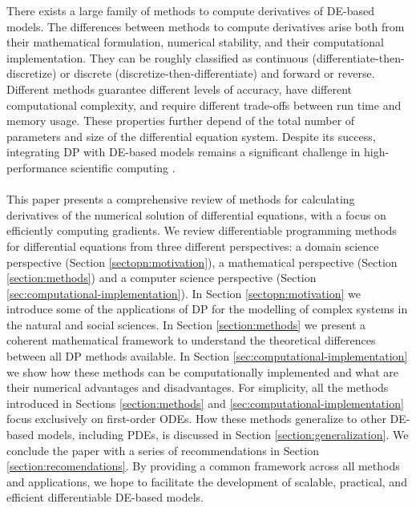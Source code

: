There exists a large family of methods to compute derivatives of DE-based models. 
The differences between methods to compute derivatives arise both from their mathematical formulation, numerical stability, and their computational implementation. 
They can be roughly classified as continuous (differentiate-then-discretize) or discrete (discretize-then-differentiate) and forward or reverse. 
Different methods guarantee different levels of accuracy, have different computational complexity, and require different trade-offs between run time and memory usage. 
These properties further depend of the total number of parameters and size of the differential equation system. 
Despite its success, integrating DP with DE-based models remains a significant challenge in high-performance scientific computing \cite{Naumann.2011}.
\\ \\
This paper presents a comprehensive review of methods for calculating derivatives of the numerical solution of differential equations, with a focus on efficiently computing gradients. 
We review differentiable programming methods for differential equations from three different perspectives: a domain science perspective (Section \ref{sectopn:motivation}), a mathematical perspective (Section \ref{section:methods}) and a computer science perspective (Section \ref{sec:computational-implementation}). 
In Section \ref{sectopn:motivation} we introduce some of the applications of DP for the modelling of complex systems in the natural and social sciences. 
In Section \ref{section:methods} we present a coherent mathematical framework to understand the theoretical differences between all DP methods available.
In Section \ref{sec:computational-implementation} we show how these methods can be computationally implemented and what are their numerical advantages and disadvantages.
For simplicity, all the methods introduced in Sections \ref{section:methods} and \ref{sec:computational-implementation} focus exclusively on first-order ODEs. 
How these methods generalize to other DE-based models, including PDEs, is discussed in Section \ref{section:generalization}.
We conclude the paper with a series of recommendations in Section \ref{section:recomendations}.
By providing a common framework across all methods and applications, we hope to facilitate the development of scalable, practical, and efficient differentiable DE-based models. 


